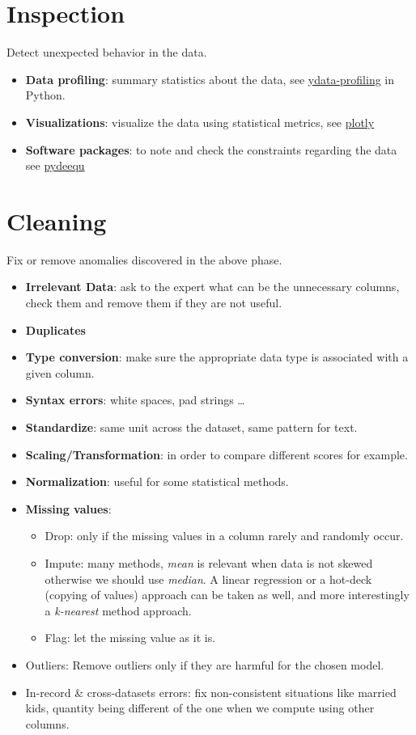 \section{Inspection} 
Detect unexpected behavior in the data.
\begin{itemize}
    \item \textbf{Data profiling}: summary statistics about the data, see \href{https://github.com/ydataai/ydata-profiling}{ydata-profiling} in Python.
    \item \textbf{Visualizations}: visualize the data using statistical metrics, see
        \href{https://plotly.com/python/}{plotly}
    \item \textbf{Software packages}: to note and check the constraints regarding the data
        see \href{https://pypi.org/project/pydeequ/}{pydeequ}
\end{itemize}

\section{Cleaning} 
Fix or remove anomalies discovered in the above phase.
\begin{itemize}
    \item \textbf{Irrelevant Data}: ask to the expert what can be the unnecessary columns,
        check them and remove them if they are not useful.
    \item \textbf{Duplicates}
    \item \textbf{Type conversion}: make sure the appropriate data type is associated with
        a given column.
    \item \textbf{Syntax errors}: white spaces, pad strings \dots
    \item \textbf{Standardize}: same unit across the dataset, same pattern for text.
    \item \textbf{Scaling/Transformation}: in order to compare different scores for 
        example.
    \item \textbf{Normalization}: useful for some statistical methods.
    \item \textbf{Missing values}: 
        \begin{itemize}
            \item Drop: only if the missing values in a column rarely and randomly occur.
            \item Impute: many methods, \textit{mean} is relevant when data is not skewed 
                otherwise we should use \textit{median}. A linear regression or a hot-deck
                (copying of values) approach can be taken as well, and more interestingly 
                a \textit{k-nearest} method approach.
            \item Flag: let the missing value as it is.
        \end{itemize}
    \item Outliers: Remove outliers only if they are harmful for the chosen model.
    \item In-record \& cross-datasets errors: fix non-consistent situations like married 
        kids, quantity being different of the one when we compute using other columns.
\end{itemize}

